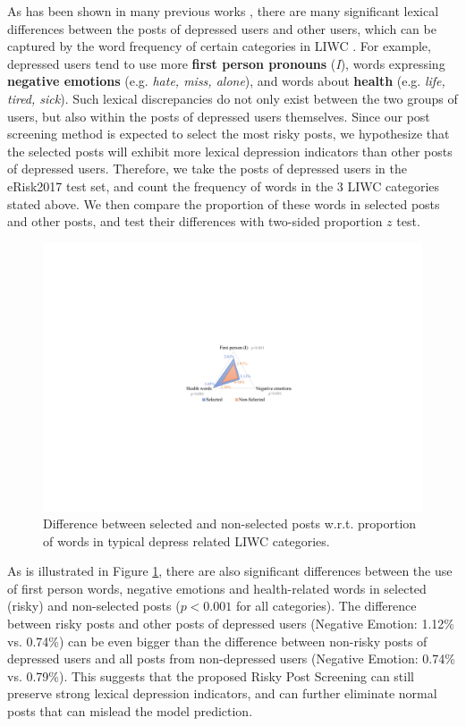 As has been shown in many previous works \citep{shen2017depression, eichstaedt2018facebook, wolohan2018detecting}, there are many significant lexical differences between the posts of depressed users and other users, which can be captured by the word frequency of certain categories in LIWC \citep{pennebaker2001linguistic}. For example, depressed users tend to use more \textbf{first person pronouns} (\textit{I}), words expressing \textbf{negative emotions} (e.g. \textit{hate, miss, alone}), and words about \textbf{health} (e.g. \textit{life, tired, sick}). Such lexical discrepancies do not only exist between the two groups of users, but also within the posts of depressed users themselves. Since our post screening method is expected to select the most risky posts, we hypothesize that the selected posts will exhibit more lexical depression indicators than other posts of depressed users. Therefore, we take the posts of depressed users in the eRisk2017 test set, and count the frequency of words in the 3 LIWC categories stated above. We then compare the proportion of these words in selected posts and other posts, and test their differences with two-sided proportion $z$ test.

\begin{figure}[h]
    \centering
    \includegraphics[width=0.9\columnwidth]{figures/lexical.pdf}
    \caption{Difference between selected and non-selected posts w.r.t. proportion of words in typical depress related LIWC categories.}
    \label{fig:lexical}
\end{figure}

As is illustrated in Figure \ref{fig:lexical}, there are also significant differences between the use of first person words, negative emotions and health-related words in selected (risky) and non-selected posts ($p < 0.001$ for all categories). The difference between risky posts and other posts of depressed users (Negative Emotion: 1.12\% vs. 0.74\%) can be even bigger than the difference between non-risky posts of depressed users and all posts from non-depressed users (Negative Emotion: 0.74\% vs. 0.79\%). This suggests that the proposed Risky Post Screening can still preserve strong lexical depression indicators, and can further eliminate normal posts that can mislead the model prediction.

